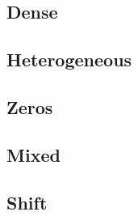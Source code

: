 \documentclass{article}
\begin{document}
\subsection{Dense}
\begin{center}\small\setlength{\tabcolsep}{4pt}\end{center}
\clearpage
\subsection{Heterogeneous}
\begin{center}\small\setlength{\tabcolsep}{4pt}\end{center}
\clearpage
\subsection{Zeros}
\begin{center}\small\setlength{\tabcolsep}{4pt}\end{center}
\clearpage
\subsection{Mixed}
\begin{center}\small\setlength{\tabcolsep}{4pt}\end{center}
\clearpage
\subsection{Shift}
\begin{center}\small\setlength{\tabcolsep}{4pt}\end{center}

\clearpage

\end{document}
